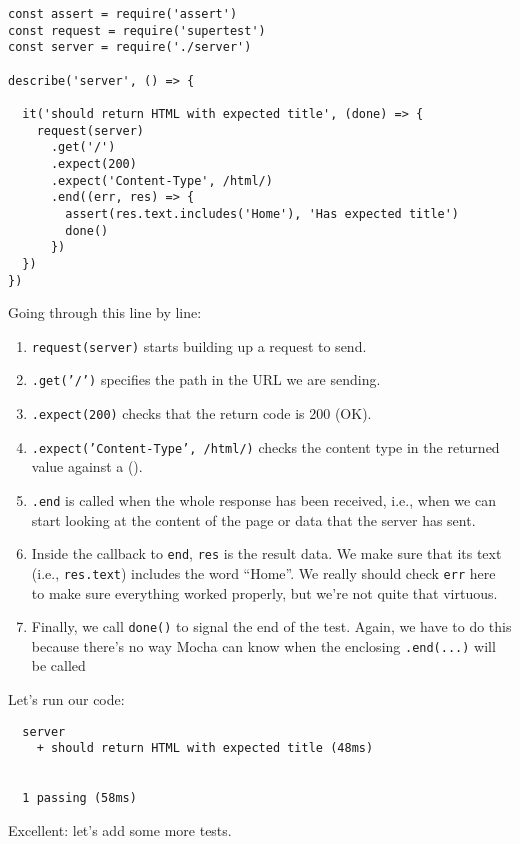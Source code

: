 \begin{verbatim}
const assert = require('assert')
const request = require('supertest')
const server = require('./server')

describe('server', () => {

  it('should return HTML with expected title', (done) => {
    request(server)
      .get('/')
      .expect(200)
      .expect('Content-Type', /html/)
      .end((err, res) => {
        assert(res.text.includes('Home'), 'Has expected title')
        done()
      })
  })
})
\end{verbatim}

Going through this line by line:

\begin{enumerate}
\item
  \texttt{request(server)} starts building up a request to send.
\item
  \texttt{.get('/')} specifies the path in the URL we are sending.
\item
  \texttt{.expect(200)} checks that the return code is 200 (OK).
\item
  \texttt{.expect('Content-Type',\ /html/)}
  checks the content type in the returned value against
  a  ().
\item
  \texttt{.end} is called when the whole response has been received,
  i.e., when we can start looking at the content of the page or data
  that the server has sent.
\item
  Inside the callback to \texttt{end},
  \texttt{res} is the result data.
  We make sure that its text (i.e., \texttt{res.text}) includes the word ``Home''.
  We really should check \texttt{err} here to make sure everything worked properly,
  but we're not quite that virtuous.
\item
  Finally, we call \texttt{done()} to signal the end of the test.
  Again,
  we have to do this because there's no way Mocha can know
  when the enclosing \texttt{.end(...)} will be called
\end{enumerate}

Let's run our code:

\begin{verbatim}
  server
    + should return HTML with expected title (48ms)


  1 passing (58ms)
\end{verbatim}

Excellent: let's add some more tests.


